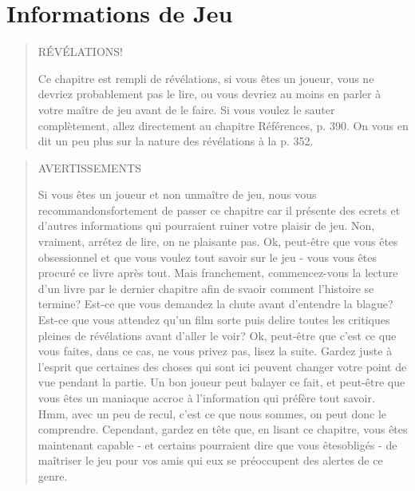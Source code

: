 



\chapter{Informations de Jeu} \label{cha:game-information} 















\begin{quotation} \begin{LARGE} \begin{center} RÉVÉLATIONS! \end{center} \end{LARGE} Ce chapitre est rempli de révélations, si vous êtes un joueur, vous ne devriez probablement pas le lire, ou vous devriez au  moins en parler à votre maître de jeu avant de le faire. Si vous voulez le sauter complètement, allez directement au chapitre Références, p. 390. On vous en dit un peu plus sur la nature des  révélations à la p. 352. \end{quotation} 

\pagebreak













\begin{quotation} \begin{LARGE} AVERTISSEMENTS \end{LARGE} 

Si vous êtes un joueur et non unmaître de jeu, nous vous recommandonsfortement de passer ce chapitre car il présente des ecrets et d'autres informations qui pourraient ruiner votre plaisir de jeu. Non, vraiment, arrétez de lire, on ne plaisante pas. Ok, peut-être que vous êtes obsessionnel et que vous voulez tout savoir sur le jeu - vous vous êtes procuré ce livre après tout. Mais franchement, commencez-vous la lecture d'un livre par le dernier chapitre afin de svaoir comment l'histoire se termine? Est-ce que vous demandez la chute avant d'entendre la blague? Est-ce que vous attendez qu'un film sorte puis delire toutes les critiques pleines de révélations avant d'aller le voir? Ok, peut-être que c'est ce que vous faites, dans ce cas, ne vous privez pas, lisez la suite. Gardez juste à l'esprit que certaines des choses qui sont ici peuvent changer votre point de vue pendant la partie. Un bon joueur peut balayer ce fait, et peut-être que vous êtes un maniaque accroc à l'information qui préfère tout savoir. Hmm, avec un peu de recul, c'est ce que nous sommes, on peut donc le comprendre. Cependant, gardez en tête que, en lisant ce chapitre, vous êtes maintenant capable - et certains pourraient dire que vous êtesobligés - de maîtriser le jeu pour vos amis qui eux se préoccupent des alertes de ce genre. \end{quotation} 



